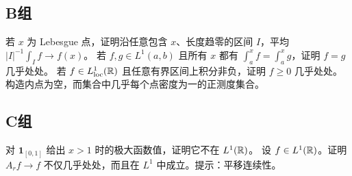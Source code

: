 \subsection*{B组}
\begin{enumerate}[label=\textbf{\thechapter.\arabic*.},resume]
若 \(x\) 为 Lebesgue 点，证明沿任意包含 \(x\)、长度趋零的区间 \(I\)，平均 \(|I|^{-1}\int_I f\to f(x)\)。
若 \(f,g\in L^1(a,b)\) 且所有 \(x\) 都有 \(\int_a^xf=\int_a^xg\)，证明 \(f=g\) 几乎处处。
若 \(f\in L^1_{\rm loc}(\mathbb{R})\) 且任意有界区间上积分非负，证明 \(f\ge0\) 几乎处处。
构造内点为空，而集合中几乎每个点密度为一的正测度集合。
\end{enumerate}
\subsection*{C组}
\begin{enumerate}[label=\textbf{\thechapter.\arabic*.},resume]
对 \(\mathbf1_{[0,1]}\) 给出 \(x>1\) 时的极大函数值，证明它不在 \(L^1(\mathbb{R})\)。
设 \(f\in L^1(\mathbb{R})\)。证明 \(A_rf\to f\) 不仅几乎处处，而且在 \(L^1\) 中成立。提示：平移连续性。
\end{enumerate}
